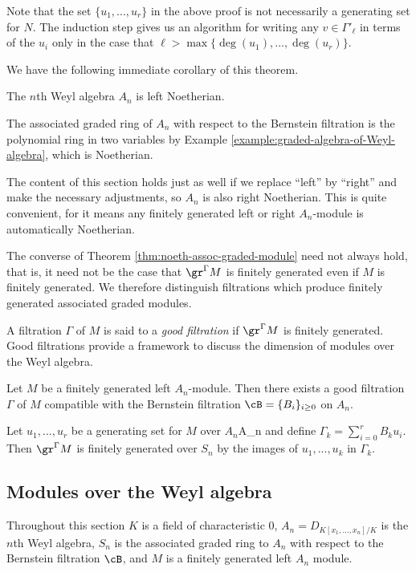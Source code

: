 Note that the set $\{u_1,...,u_r\}$ in the above proof is not necessarily a generating set for $N$. The induction step gives us an algorithm for writing any $v \in \Gamma'_\ell$ in terms of the $u_i$ only in the case that $\ell > \max\{\deg(u_1),...,\deg(u_r)\}$.

We have the following immediate corollary of this theorem.
\begin{cor}\label{cor:Weyl-algebra-Noetherian}
	The $n$th Weyl algebra $A_n$ is left Noetherian.
\end{cor}
\begin{prf}
	The associated graded ring of $A_n$ with respect to the Bernstein filtration is the polynomial ring in two variables by Example \ref{example:graded-algebra-of-Weyl-algebra}, which is Noetherian.
\end{prf}
The content of this section holds just as well if we replace ``left'' by ``right'' and make the necessary adjustments, so $A_n$ is also right Noetherian. This is quite convenient, for it means any finitely generated left or right $A_n$-module is automatically Noetherian.

The converse of Theorem \ref{thm:noeth-assoc-graded-module} need not always hold, that is, it need not be the case that $\gr^{\Gamma}M$ is finitely generated even if $M$ is finitely generated. We therefore distinguish filtrations which produce finitely generated associated graded modules.
\begin{defn}\label{defn:good-filtration}
	A filtration $\Gamma$ of $M$ is said to a \emph{good filtration} if $\gr^\Gamma M$ is finitely generated. Good filtrations provide a framework to discuss the dimension of modules over the Weyl algebra.
\end{defn}

\begin{prop}\label{prop:good-filtrations-exist}
	Let $M$ be a finitely generated left $A_n$-module. Then there exists a good filtration $\Gamma$ of $M$ compatible with the Bernstein filtration $\cB = \{B_i\}_{i\geq 0}$ on $A_n$.
\end{prop}
\begin{prf}
	Let $u_1,...,u_r$ be a generating set for $M$ over $A_n$A_n and define $\Gamma_k = \sum_{i=0}^rB_ku_i$. Then $\gr^\Gamma M$ is finitely generated over $S_n$ by the images of $u_1,...,u_k$ in $\Gamma_k$.
\end{prf}

\subsection{Modules over the Weyl algebra}
Throughout this section $K$ is a field of characteristic $0$, $A_n = D_{K[x_1,...,x_n]/K}$ is the $n$th Weyl algebra, $S_n$ is the associated graded ring to $A_n$ with respect to the Bernstein filtration $\cB$, and $M$ is a finitely generated left $A_n$ module.

